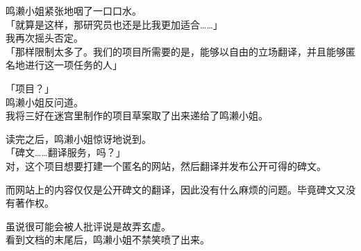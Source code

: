 鸣濑小姐紧张地咽了一口口水。\\

「就算是这样，那研究员也还是比我更加适合……」\\

我再次摇头否定。\\

「那样限制太多了。我们的项目所需要的是，能够以自由的立场翻译，并且能够匿名地进行这一项任务的人」

「项目？」\\

鸣濑小姐反问道。\\

我将三好在迷宫里制作的项目草案取了出来递给了鸣濑小姐。

读完之后，鸣濑小姐惊讶地说到。\\

「碑文……翻译服务，吗？」\\

对，这个项目想要打建一个匿名的网站，然后翻译并发布公开可得的碑文。

而网站上的内容仅仅是公开碑文的翻译，因此没有什么麻烦的问题。毕竟碑文又没有著作权。

虽说很可能会被人批评说是故弄玄虚。\\

看到文档的末尾后，鸣濑小姐不禁笑喷了出来。\\

